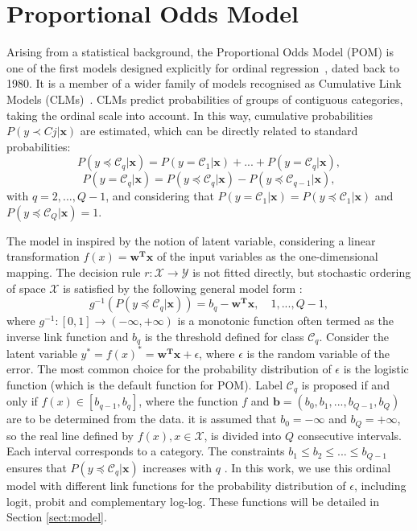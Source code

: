 \documentclass[journal]{IEEEtran}
\begin{document}
	\section{Proportional Odds Model}
	\label{sect:pom}
	Arising from a statistical background, the Proportional Odds Model (POM) is one of the first models designed explicitly for ordinal regression~\cite{mccullagh1980regression}, dated back to 1980. It is a member of a wider family of models recognised as Cumulative Link Models (CLMs)~\cite{agresti2010analysis}. CLMs predict probabilities of groups of contiguous categories, taking the ordinal scale into account. In this way, cumulative probabilities $P(y \prec Cj |\mathbf{x})$ are estimated, which can be directly related to standard probabilities:
	\begin{equation}
		P(y \preceq \mathcal{C}_q | \mathbf{x}) = P(y = \mathcal{C}_1 | \mathbf{x}) + ... + P(y = \mathcal{C}_q | \mathbf{x}),
	\end{equation}
	\begin{equation}
		P(y = \mathcal{C}_q | \mathbf{x}) = P(y \preceq \mathcal{C}_q | \mathbf{x}) - P(y \preceq \mathcal{C}_{q-1} | \mathbf{x}),
	\end{equation}
	with $q = 2, ..., Q-1$, and considering that $P(y = \mathcal{C}_1 | \mathbf{x}) = P(y \preceq \mathcal{C}_1 | \mathbf{x})$ and $P(y \preceq \mathcal{C}_Q | \mathbf{x}) = 1$.
	
	The model in inspired by the notion of latent variable, considering a linear transformation $f(x) = \mathbf{w^Tx}$ of the input variables as the one-dimensional mapping. The decision rule $r: \mathcal{X} \rightarrow \mathcal{Y}$ is not fitted directly, but stochastic ordering of space $\mathcal{X}$ is satisfied by the following general model form \cite{herbrich2000large}:
	\begin{equation}
		g^{-1}(P(y \preceq \mathcal{C}_q | \mathbf{x})) = b_q - \mathbf{w^Tx}, \quad 1, ..., Q-1,
	\end{equation}
	where $g^{-1} : [0,1] \rightarrow (-\infty, +\infty)$ is a monotonic function often termed as the inverse link function and $b_q$ is the threshold defined for class $\mathcal{C}_q$. Consider the latent variable $y^* = f(x)^* = \mathbf{w^Tx} + \epsilon$, where $\epsilon$ is the random variable of the error. The most common choice for the probability distribution of $\epsilon$ is the logistic function (which is the default function for POM). Label $\mathcal{C}_q$ is proposed if and only if $f(x) \in [b_{q-1}, b_q]$, where the function $f$ and $\mathbf{b} = (b_0, b_1, ..., b_{Q-1}, b_Q)$ are to be determined from the data. it is assumed that $b_0 = -\infty$ and $b_Q = +\infty$, so the real line defined by $f(x), x \in \mathcal{X}$, is divided into $Q$ consecutive intervals. Each interval corresponds to a category. The constraints $b_1 \le b_2 \le ... \le b_{Q-1}$ ensures that $P(y \preceq \mathcal{C}_q | \mathbf{x})$ increases with $q$ \cite{mccullagh1980regression}.
	In this work, we use this ordinal model with different link functions for the probability distribution of $\epsilon$, including logit, probit and complementary log-log. These functions will be detailed in Section \ref{sect:model}.
\end{document}
